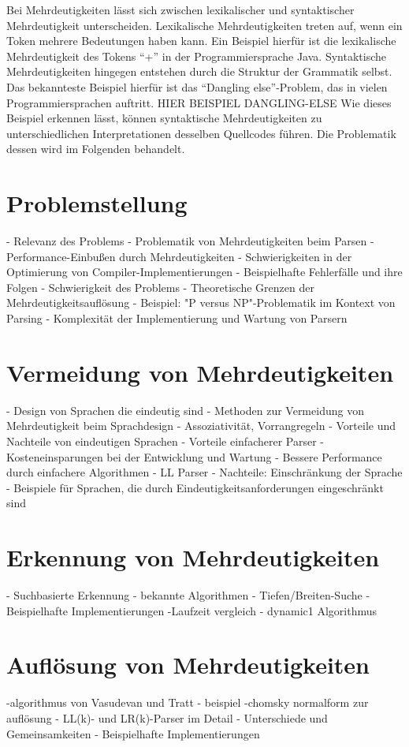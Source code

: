 \documentclass[runningheads]{llncs}
\begin{document}
Bei Mehrdeutigkeiten lässt sich zwischen lexikalischer und syntaktischer Mehrdeutigkeit unterscheiden.
Lexikalische Mehrdeutigkeiten treten auf, wenn ein Token mehrere Bedeutungen haben kann.
Ein Beispiel hierfür ist die lexikalische Mehrdeutigkeit des Tokens ``+'' in der Programmiersprache Java.
Syntaktische Mehrdeutigkeiten hingegen entstehen durch die Struktur der Grammatik selbst.
Das bekannteste Beispiel hierfür ist das ``Dangling else''-Problem, das in vielen Programmiersprachen auftritt.
HIER BEISPIEL DANGLING-ELSE
Wie dieses Beispiel erkennen lässt,
können syntaktische Mehrdeutigkeiten zu unterschiedlichen Interpretationen desselben Quellcodes führen.
Die Problematik dessen wird im Folgenden behandelt.


\section{Problemstellung}

- Relevanz des Problems
- Problematik von Mehrdeutigkeiten beim Parsen
- Performance-Einbußen durch Mehrdeutigkeiten
- Schwierigkeiten in der Optimierung von Compiler-Implementierungen
- Beispielhafte Fehlerfälle und ihre Folgen
- Schwierigkeit des Problems
- Theoretische Grenzen der Mehrdeutigkeitsauflösung
- Beispiel: "P versus NP"-Problematik im Kontext von Parsing
- Komplexität der Implementierung und Wartung von Parsern

\section{Vermeidung von Mehrdeutigkeiten}
- Design von Sprachen die eindeutig sind
- Methoden zur Vermeidung von Mehrdeutigkeit beim Sprachdesign
- Assoziativität, Vorrangregeln
- Vorteile und Nachteile von eindeutigen Sprachen
- Vorteile einfacherer Parser
- Kosteneinsparungen bei der Entwicklung und Wartung
- Bessere Performance durch einfachere Algorithmen
- LL Parser
- Nachteile: Einschränkung der Sprache
- Beispiele für Sprachen, die durch Eindeutigkeitsanforderungen eingeschränkt sind

\section{Erkennung von Mehrdeutigkeiten}
- Suchbasierte Erkennung
- bekannte Algorithmen
- Tiefen/Breiten-Suche
- Beispielhafte Implementierungen
-Laufzeit vergleich
- dynamic1 Algorithmus

\section{Auflösung von Mehrdeutigkeiten}
-algorithmus von Vasudevan und Tratt
- beispiel
-chomsky normalform zur auflösung
- LL(k)- und LR(k)-Parser im Detail
- Unterschiede und Gemeinsamkeiten
- Beispielhafte Implementierungen
\end{document}
